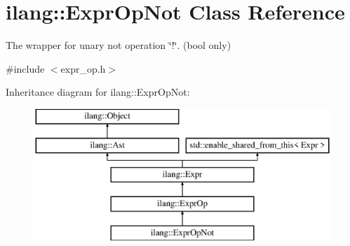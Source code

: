 \hypertarget{classilang_1_1_expr_op_not}{}\section{ilang\+:\+:Expr\+Op\+Not Class Reference}
\label{classilang_1_1_expr_op_not}


The wrapper for unary not operation \char`\"{}!\char`\"{}. (bool only)  




{\ttfamily \#include $<$expr\+\_\+op.\+h$>$}

Inheritance diagram for ilang\+:\+:Expr\+Op\+Not\+:\begin{figure}[H]
\begin{center}
\leavevmode
\includegraphics[height=5.000000cm]{classilang_1_1_expr_op_not}
\end{center}
\end{figure}
